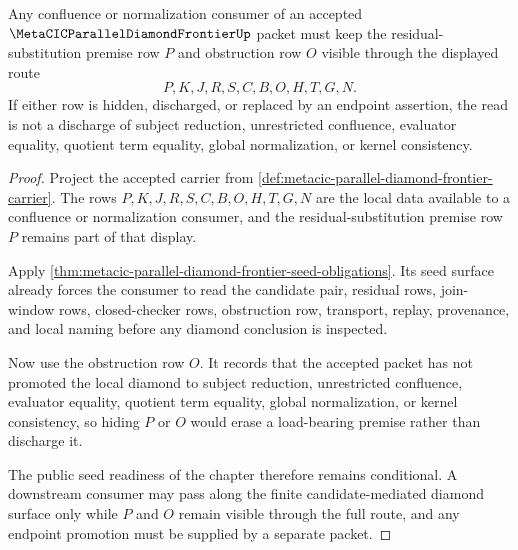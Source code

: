 \begin{theorem}
\label{thm:metacic-parallel-diamond-frontier-retained-obstruction-obligation}
Any confluence or normalization consumer of an accepted $\MetaCICParallelDiamondFrontierUp$ packet must keep the residual-substitution premise row $P$ and obstruction row $O$ visible through the displayed route
$$
P,K,J,R,S,C,B,O,H,T,G,N .
$$
If either row is hidden, discharged, or replaced by an endpoint assertion, the read is not a discharge of subject reduction, unrestricted confluence, evaluator equality, quotient term equality, global normalization, or kernel consistency.
\end{theorem}
\begin{proof}
Project the accepted carrier from \autoref{def:metacic-parallel-diamond-frontier-carrier}. The rows $P,K,J,R,S,C,B,O,H,T,G,N$ are the local data available to a confluence or normalization consumer, and the residual-substitution premise row $P$ remains part of that display.

Apply \autoref{thm:metacic-parallel-diamond-frontier-seed-obligations}. Its seed surface already forces the consumer to read the candidate pair, residual rows, join-window rows, closed-checker rows, obstruction row, transport, replay, provenance, and local naming before any diamond conclusion is inspected.

Now use the obstruction row $O$. It records that the accepted packet has not promoted the local diamond to subject reduction, unrestricted confluence, evaluator equality, quotient term equality, global normalization, or kernel consistency, so hiding $P$ or $O$ would erase a load-bearing premise rather than discharge it.

The public seed readiness of the chapter therefore remains conditional. A downstream consumer may pass along the finite candidate-mediated diamond surface only while $P$ and $O$ remain visible through the full route, and any endpoint promotion must be supplied by a separate packet.
\end{proof}

